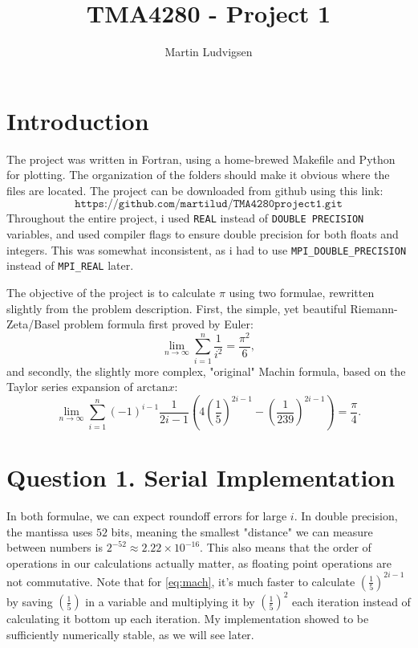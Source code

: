 \documentclass[12pt]{article}
\author{Martin Ludvigsen}
\title{TMA4280 - Project 1}
\begin{document}
\maketitle
\section{Introduction}
The project was written in Fortran, using a home-brewed Makefile and Python for plotting. The organization of the folders
should make it obvious where the files are located. The project can be downloaded from github using this link:
\begin{equation*}
    \texttt{https://github.com/martilud/TMA4280project1.git}
\end{equation*}
Throughout the entire project, i used \texttt{REAL} instead of \texttt{DOUBLE PRECISION} variables, and used compiler flags to ensure double precision for both floats and integers.
This was somewhat inconsistent, as i had to use \texttt{MPI\_DOUBLE\_PRECISION} instead of \texttt{MPI\_REAL} later.

The objective of the project is to calculate $\pi$ using two formulae, rewritten slightly from the problem description. First, the simple, yet beautiful Riemann-Zeta/Basel problem formula
first proved by Euler:
\begin{equation}
    \lim_{n \rightarrow \infty} \sum_{i = 1}^n \frac{1}{i^2} = \frac{\pi^2}{6},
    \label{eq:zeta}
\end{equation}
and secondly, the slightly more complex, "original" Machin formula, based on the Taylor series expansion of $\text{arctan} x$:
\begin{equation}
    \lim_{n \rightarrow \infty} \sum_{i = 1}^n (-1)^{i-1} \frac{1}{2i-1}\left(4 \left(\frac{1}{5}\right)^{2i-1} - \left(\frac{1}{239}\right)^{2i-1}\right) = \frac{\pi}{4}.
    \label{eq:mach}
\end{equation}

\section{Question 1. Serial Implementation}
In both formulae, we can expect roundoff errors for large $i$. In double precision, the mantissa uses $52$ bits, meaning the smallest "distance" we can measure
between numbers is $2^{-52} \approx 2.22 \times 10^{-16}$. This also means that the order of operations in our calculations actually matter, as floating point operations are not commutative.
Note that for \eqref{eq:mach}, it's much faster to calculate $\left(\frac{1}{5}\right)^{2i-1}$ by saving $\left(\frac{1}{5}\right)$ in a variable and multiplying it by 
$\left(\frac{1}{5}\right)^2$ each iteration instead of calculating it bottom up each iteration.
My implementation showed to be sufficiently numerically stable, as we will see later. 
\end{document}
